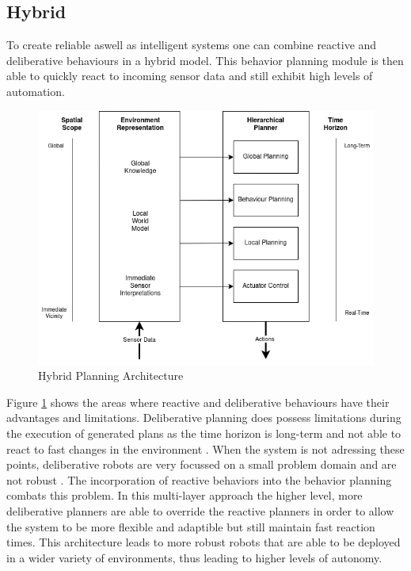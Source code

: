 %

\subsection{Hybrid}
To create reliable aswell as intelligent systems one can combine reactive and deliberative behaviours in a hybrid model. This behavior planning module is then able to quickly react to incoming sensor data and still exhibit high levels of automation. 

\begin{figure}[ht]
	\label{fig:hybrid_planning}
	\includegraphics[width=1.0\textwidth]{images/Deliberative_hierarchical_planning.png} 
	\caption{Hybrid Planning Architecture \cite{arkin1998}  }
\end{figure}

Figure \ref{fig:hybrid_planning} shows the areas where reactive and deliberative behaviours have their advantages and limitations. Deliberative planning does possess limitations during the execution of generated plans as the time horizon is long-term and not able to react to fast changes in the environment . When the system is not adressing these points, deliberative robots are very focussed on a small problem domain and are not robust \cite{arkin1998}.
The incorporation of reactive behaviors into the behavior planning combats this problem. In this multi-layer approach the higher level, more deliberative planners are able to override the reactive planners in order to allow the system to be more flexible and adaptible but still maintain fast reaction times. 
This architecture leads to more robust robots that are able to be deployed in a wider variety of environments, thus leading to higher levels of autonomy.


